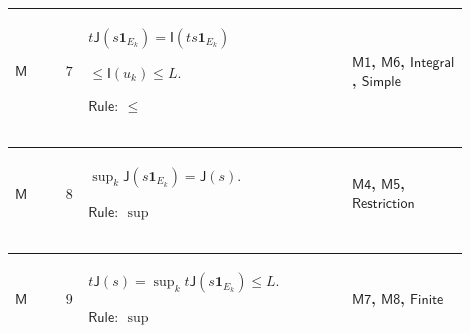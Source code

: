 \documentclass[12pt,reqno]{amsart}
\theoremstyle{blueplain}
\numberwithin{equation}{section}
\begin{document}
{\scriptsize \setlength{\parskip}{0pt}\nointerlineskip
\noindent 
\begin{tabular}{|@{}>{\centering\arraybackslash}m{0.10658\linewidth}|>{\centering\arraybackslash}m{0.03553\linewidth}|>{\centering\arraybackslash}m{0.52105\linewidth}|>{\centering\arraybackslash}m{0.23684\linewidth}|}
\hline
\hypertarget{proof:M7}{$\displaystyle \mathsf{M}$} & $\displaystyle 7$ & $%
\displaystyle t\mathsf{J}(s\mathbf{1}_{E_k})=\mathsf{I}(ts\mathbf{1}_{E_k})$%
\par$\displaystyle {}\le\mathsf{I}(u_k)\le L.$\par$\displaystyle \mathsf{Rule%
}:\ \le$ & \hyperlink{proof:M1}{$\displaystyle \mathsf{M1}$}, \hyperlink{proof:M6}%
{$\displaystyle \mathsf{M6}$}, \hyperlink{lem:Integral}{$\displaystyle 
\mathsf{Integral}$}, \hyperlink{lem:Simple}{$\displaystyle \mathsf{Simple}$}
\\ \hline
\end{tabular}%
}

{\scriptsize \setlength{\parskip}{0pt}\nointerlineskip
\noindent 
\begin{tabular}{|@{}>{\centering\arraybackslash}m{0.10658\linewidth}|>{\centering\arraybackslash}m{0.03553\linewidth}|>{\centering\arraybackslash}m{0.52105\linewidth}|>{\centering\arraybackslash}m{0.23684\linewidth}|}
\hline
\hypertarget{proof:M8}{$\displaystyle \mathsf{M}$} & $\displaystyle 8$ & $%
\displaystyle \sup_k\mathsf{J}(s\mathbf{1}_{E_k})=\mathsf{J}(s).$\par$%
\displaystyle \mathsf{Rule}:\ \sup$ & \hyperlink{proof:M4}{$\displaystyle 
\mathsf{M4}$}, \hyperlink{proof:M5}{$\displaystyle \mathsf{M5}$}, \hyperlink{lem:Restriction}%
{$\displaystyle \mathsf{Restriction}$} \\ \hline
\end{tabular}%
}

{\scriptsize \setlength{\parskip}{0pt}\nointerlineskip
\noindent 
\begin{tabular}{|@{}>{\centering\arraybackslash}m{0.10658\linewidth}|>{\centering\arraybackslash}m{0.03553\linewidth}|>{\centering\arraybackslash}m{0.52105\linewidth}|>{\centering\arraybackslash}m{0.23684\linewidth}|}
\hline
\hypertarget{proof:M9}{$\displaystyle \mathsf{M}$} & $\displaystyle 9$ & $%
\displaystyle t\mathsf{J}(s)=\sup_k t\mathsf{J}(s\mathbf{1}_{E_k})\le L.$\par%
$\displaystyle \mathsf{Rule}:\ \sup$ & \hyperlink{proof:M7}{$\displaystyle 
\mathsf{M7}$}, \hyperlink{proof:M8}{$\displaystyle \mathsf{M8}$}, \hyperlink{lem:Finite}%
{$\displaystyle \mathsf{Finite}$} \\ \hline
\end{tabular}%
}
\end{document}
